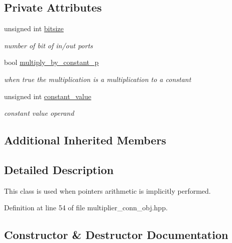 \subsection*{Private Attributes}
\begin{DoxyCompactItemize}
\item 
unsigned int \hyperlink{classmultiplier__conn__obj_a3b4469122efc43e24cdde0102b3d0e71}{bitsize}
\begin{DoxyCompactList}\small\item\em number of bit of in/out ports \end{DoxyCompactList}\item 
bool \hyperlink{classmultiplier__conn__obj_a27dcb916013135f4d7cdfadaeb368bcf}{multiply\+\_\+by\+\_\+constant\+\_\+p}
\begin{DoxyCompactList}\small\item\em when true the multiplication is a multiplication to a constant \end{DoxyCompactList}\item 
unsigned int \hyperlink{classmultiplier__conn__obj_a1d06a00581692ff951adf1d7a44cf929}{constant\+\_\+value}
\begin{DoxyCompactList}\small\item\em constant value operand \end{DoxyCompactList}\end{DoxyCompactItemize}
\subsection*{Additional Inherited Members}


\subsection{Detailed Description}
This class is used when pointers arithmetic is implicitly performed. 

Definition at line 54 of file multiplier\+\_\+conn\+\_\+obj.\+hpp.



\subsection{Constructor \& Destructor Documentation}
\mbox{\label{classmultiplier__conn__obj_a2a8dd975d60b62c0d5edb3ff408608ef}} 
